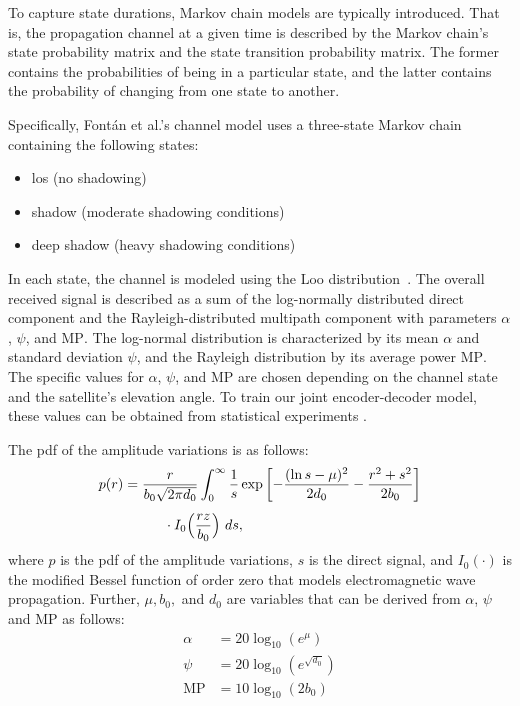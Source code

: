\documentclass[conference]{IEEEtran}
\newcommand\MP{\ensuremath{\mathrm{MP}}\xspace}
\begin{document}
To capture state durations, Markov chain models are typically introduced.
That is, the propagation channel at a given time is described by the Markov chain's state probability matrix and the state transition probability matrix.
The former contains the probabilities of being in a particular state, and the latter contains the probability of changing from one state to another.

Specifically, Fontán et al.'s channel model \cite{966585} uses a three-state Markov chain containing the following states:
%
\begin{itemize}
  \item \ac{los} (no shadowing)
  \item shadow (moderate shadowing conditions)
  \item deep shadow (heavy shadowing conditions)
\end{itemize}
%
In each state, the channel is modeled using the Loo distribution~\cite{1623307}. 
The overall received signal is described as a sum of the log-normally distributed direct component and the Rayleigh-distributed multipath component with parameters $\alpha$, $\psi$, and \MP.
The log-normal distribution is characterized by its mean $\alpha$ and standard deviation $\psi$, and the Rayleigh distribution by its average power \MP.
The specific values for $\alpha$, $\psi$, and \MP are chosen depending on the channel state and the satellite's elevation angle.
To train our joint encoder-decoder model, these values can be obtained from statistical experiments \cite{channel-params}.

The \ac{pdf} of the amplitude variations is as follows:
\begin{align}
  p(r) &= \frac{r}{b_0\sqrt{2\pi d_0}} \nonumber
  \int_{0}^{\infty}\frac{1}{s} \exp\left[-\frac{(\ln s - \mu)^2}{2d_0} - \frac{r^2 + s^2}{2b_0}\right] \\[1ex]
  &\hphantom{=\int_{0}^{\infty}} \cdot I_0\Big(\frac{rz}{b_0}\Big)\ ds,
\end{align}
%
where $p$ is the \ac{pdf} of the amplitude variations, $s$ is the direct signal, and $I_0(\cdot)$ is the modified Bessel function of order zero that models electromagnetic wave propagation.
Further, $\mu, b_0,$ and $d_0$ are variables that can be derived from $\alpha$, $\psi$ and \MP as follows:
%
\begin{align}
\alpha &= 20\log_{10}(e^\mu) \\
  \psi &= 20\log_{10}(e^{\sqrt{d_0}}) \\
   \MP &= 10\log_{10}(2b_0)
\end{align}
\end{document}
